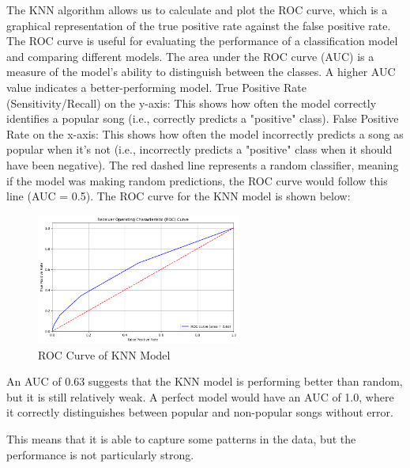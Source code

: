 \newpage

The KNN algorithm allows us to calculate and plot the ROC curve, which is a graphical representation of the true positive rate against the false positive rate. The ROC curve is useful for evaluating the performance of a classification model and comparing different models. The area under the ROC curve (AUC) is a measure of the model's ability to distinguish between the classes. A higher AUC value indicates a better-performing model.
True Positive Rate (Sensitivity/Recall) on the y-axis: This shows how often the model correctly identifies a popular song (i.e., correctly predicts a "positive" class).
False Positive Rate on the x-axis: This shows how often the model incorrectly predicts a song as popular when it's not (i.e., incorrectly predicts a "positive" class when it should have been negative).
The red dashed line represents a random classifier, meaning if the model was making random predictions, the ROC curve would follow this line (AUC = 0.5).
The ROC curve for the KNN model is shown below:

\begin{figure} [H]
    \centering
    \includegraphics[width=0.6\textwidth]{media/roc_curve.png}
    \caption{ROC Curve of KNN Model}
    \label{fig:knn_roc_curve}
\end{figure}

An AUC of 0.63 suggests that the KNN model is performing better than random, but it is still relatively weak.
A perfect model would have an AUC of 1.0, where it correctly distinguishes between popular and non-popular songs without error.

This means that it is able to capture some patterns in the data, but the performance is not particularly strong. 